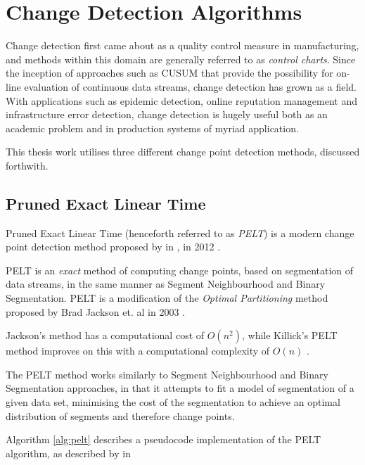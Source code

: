 \documentclass[../main.tex]{subfiles}
\begin{document}
\section{Change Detection Algorithms}

Change detection first came about as a quality control measure in manufacturing, and methods within this domain are generally referred to as \emph{control charts}. Since the inception of approaches such as CUSUM \cite{Page1954} that provide the possibility for on-line evaluation of continuous data streams, change detection has grown as a field. With applications such as epidemic detection, online reputation management and infrastructure error detection, change detection is hugely useful both as an academic problem and in production systems of myriad application.

This thesis work utilises three different change point detection methods, discussed forthwith.

\subsection{Pruned Exact Linear Time}

Pruned Exact Linear Time (henceforth referred to as \emph{PELT}) is a modern change point detection method proposed by \citeauthor{Killick2011a} in , in 2012 \cite{Killick2011a}.

PELT is an \emph{exact} method of computing change points, based on segmentation of data streams, in the same manner as Segment Neighbourhood and Binary Segmentation. PELT is a modification of the \emph{Optimal Partitioning} method proposed by Brad Jackson et. al in 2003 \cite{Jackson2003}.

Jackson's method has a computational cost of $O(n^2)$, while Killick's PELT method improves on this with a computational complexity of $O(n)$ \cite{Killick2011a}.

The PELT method works similarly to Segment Neighbourhood \cite{Auger1989} and Binary Segmentation \cite{Jackson2003} \cite{Yao1984} approaches, in that it attempts to fit a model of segmentation of a given data set, minimising the cost of the segmentation to achieve an optimal distribution of segments and therefore change points.

Algorithm \autoref{alg:pelt} describes a pseudocode implementation of the PELT algorithm, as described by \citeauthor{Eckley2011} in  \cite{Eckley2011}\newline
\end{document}

